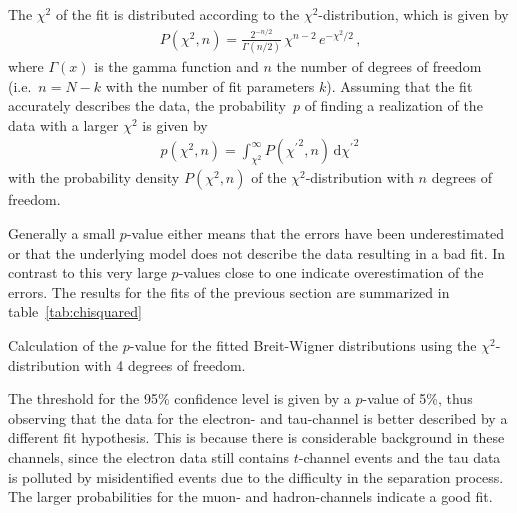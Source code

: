 \documentclass[11pt, a4paper]{article}
\numberwithin{equation}{section}
\newcommand\dinf[1]{ \,\mathrm{d}#1 }
\begin{document}
The $\chi^2$ of the fit is distributed according to the $\chi^2$-distribution, which is given by \cite{barlow}
\begin{align*}
	P(\chi^2, n) = \frac{2^{- n / 2}}{\Gamma(n / 2)} \, \chi^{n - 2} \, e^{-\chi^2 / 2} \,\text{,}
\end{align*}
where $\Gamma(x)$ is the gamma function and $n$ the number of degrees of freedom (i.e.\ $n = N - k$ with the number of fit parameters $k$).
Assuming that the fit accurately describes the data, the probability~$p$ of finding a realization of the data with a larger $\chi^2$ is given by
\begin{align*}
	p(\chi^2, n) = \int_{\chi^2}^\infty P({\chi^\prime}^2, n) \dinf{{\chi^\prime}^2}
\end{align*}
with the probability density $P(\chi^2, n)$ of the $\chi^2$-distribution with $n$ degrees of freedom.

Generally a small $p$-value either means that the errors have been underestimated or that the underlying model does not describe the data resulting in a bad fit.
In contrast to this very large $p$-values close to one indicate overestimation of the errors.
The results for the fits of the previous section are summarized in table~\ref{tab:chisquared}
\begin{table}[h]
	\centering
	
	\caption{Calculation of the $p$-value for the fitted Breit-Wigner distributions using the $\chi^2$-distribution with 4 degrees of freedom.}
	\label{tab:chisquared}
\end{table}
The threshold for the 95\% confidence level is given by a $p$-value of 5\%, thus observing that the data for the electron- and tau-channel is better described by a different fit hypothesis.
This is because there is considerable background in these channels, since the electron data still contains $t$-channel events and the tau data is polluted by misidentified events due to the difficulty in the separation process.
The larger probabilities for the muon- and hadron-channels indicate a good fit.
\end{document}
